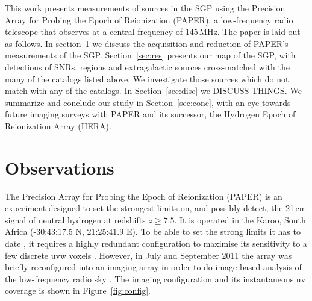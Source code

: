 \documentclass[preprint2,epsf,epsfig,graphics]{emulateapj}
\begin{document}
This work presents measurements of sources in the SGP using the Precision Array for Probing the Epoch of Reionization (PAPER), a low-frequency radio telescope that observes at a central frequency of 145\,MHz. The paper is laid out as follows. In section~\ref{sec:obs} we discuss the acquisition and reduction of PAPER's measurements of the SGP. Section~\ref{sec:res} presents our map of the SGP, with detections of SNRs,  regions and extragalactic sources cross-matched with the many of the catalogs listed above. We investigate those sources which do not match with any of the catalogs. In Section~\ref{sec:disc} we {\color{red} DISCUSS THINGS}. We summarize and conclude our study in Section~\ref{sec:conc}, with an eye towards future imaging surveys with PAPER and its successor, the Hydrogen Epoch of Reionization Array (HERA).

\section{Observations}
\label{sec:obs}

The Precision Array for Probing the Epoch of Reionization (PAPER) is an experiment designed to set the strongest limits on, and possibly detect, the 21\,cm signal of neutral hydrogen at redshifts $z \geq 7.5$. It is operated in the Karoo, South Africa (-30:43:17.5 N, 21:25:41.9 E). To be able to set the strong limits it has to date \citep[][Cheng et al. in prep., Kohn et al. in prep.?]{Parsons.14, Jacobs.14, Ali.15, Moore.15}, it requires a highly redundant configuration to maximise its sensitivity to a few discrete uvw voxels \citep[e.g.][]{Parsons.12}. However, in July and September 2011 the array was briefly reconfigured into an imaging array in order to do image-based analysis of the low-frequency radio sky \citep[e.g.][]{Stefan.13}. The imaging configuration and its instantaneous uv coverage is shown in Figure~\ref{fig:config}.
\end{document}

